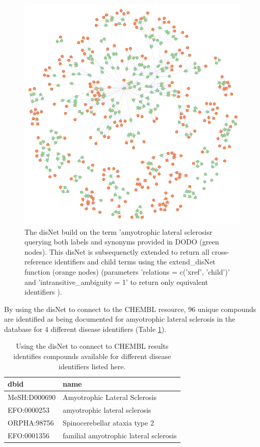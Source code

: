 \documentclass[9pt,a4paper,]{extarticle}
\begin{document}
\begin{figure}

{\centering \includegraphics[width=0.75\linewidth]{fig/disNet_als_extension} 

}

\caption{The disNet build on the term 'amyotrophic lateral sclerosisr querying both labels and synonyms provided in DODO (green nodes). This disNet is subsequenctly extended to return all cross-reference identifiers and child terms using the extend\_disNet function (orange nodes) (parameters 'relations = c('xref', 'child')' and 'intransitive\_ambiguity = 1' to return only equivalent identifiers ).}\label{fig:disNetalsExtension}
\end{figure}

By using the disNet to connect to the CHEMBL resource, 96 unique compounds are identified as being documented for amyotrophic lateral sclerosis in the database for 4 different disease identifiers (Table \ref{tab:chemblDisNetind}).

\begin{table}

\caption{\label{tab:chemblDisNetind}Using the disNet to connect to CHEMBL results identifies compounds available for different disease identifiers listed here.}
\centering
\begin{tabular}[t]{l|l}
\hline
dbid & name\\
\hline
MeSH:D000690 & Amyotrophic Lateral Sclerosis\\
\hline
EFO:0000253 & amyotrophic lateral sclerosis\\
\hline
ORPHA:98756 & Spinocerebellar ataxia type 2\\
\hline
EFO:0001356 & familial amyotrophic lateral sclerosis\\
\hline
\end{tabular}
\end{table}
\end{document}
